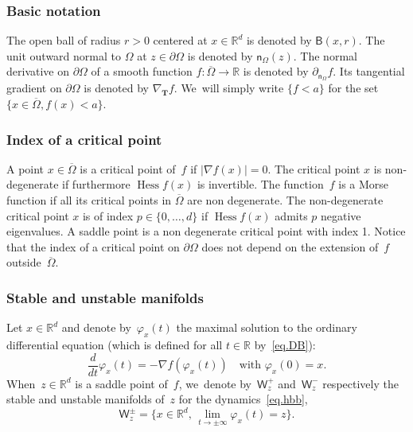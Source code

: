 \documentclass[10pt]{amsart}
\newcommand{\mbf}[1]{\mathbf{#1}}
\DeclareMathOperator{\hess}{Hess}\let\Hess\hess
\theoremstyle{plain}
\theoremstyle{definition}
\begin{document}
\subsubsection*{Basic notation} The open ball of radius $r>0$ centered at $x\in \mathbb R^d$ is denoted by $\mathsf B(x,r)$. The unit outward normal to $\Omega$ at $z\in \partial \Omega$ is denoted by $\mathsf n_\Omega(z)$. The normal derivative on $\partial \Omega$ of a smooth function $f:\overline \Omega\to \mathbb R$ is denoted by $\partial_{\mathsf n_\Omega}f$. Its tangential gradient on $\partial \Omega$ is denoted by $\nabla_{\mbf T}f$. We~will simply write $\{f<a\}$ for the set \hbox{$\{x\in \overline \Omega, f(x)<a\}$}.

\subsubsection*{Index of a critical point} A point $x \in \overline{\Omega}$ is a critical
point of~$f$ if $|\nabla f(x)|=0$. The critical point $x$ is non-degenerate
if furthermore $\hess f(x)$ is invertible. The function~$f$ is a Morse function if all its critical points in $\overline \Omega$ are non degenerate. The non-degenerate critical
point $x$ is of index $p\in \{0,\ldots,d\}$ if $\hess f(x)$ admits $p$
negative eigenvalues. A saddle point is a non
degenerate critical point with index 1. Notice that the
index of a critical point on $\partial \Omega$ does not depend on the
extension of~$f$ outside~$\overline{\Omega}$.

\subsubsection*{Stable and unstable manifolds}
Let $x\in \mathbb R^d$ and denote by~$\varphi_x(t)$ the maximal
solution to the ordinary differential equation (which is defined
for all $t \in \mathbb R$ by~\eqref{eq.DB}):
\begin{equation}\label{eq.hbb}
\frac{d}{dt}\varphi_x(t)=-\nabla f(\varphi_x(t)) \quad\text{with } \varphi_x(0)=x.
\end{equation}
When~$z\in\mathbb R^d$ is a saddle point of~$f$, we~denote by~$\mathsf W_z^+$ and~$\mathsf W_z^-$ respectively the stable and unstable manifolds of~$z$ for the dynamics~\eqref{eq.hbb}, \ie
\begin{equation}\label{eq.stablem}
\mathsf W_z^{\pm}=\Big \{x\in \mathbb R^d,\, \lim_{t\to \pm \infty}\varphi_x(t)= z \Big \}.
\end{equation}
\end{document}
